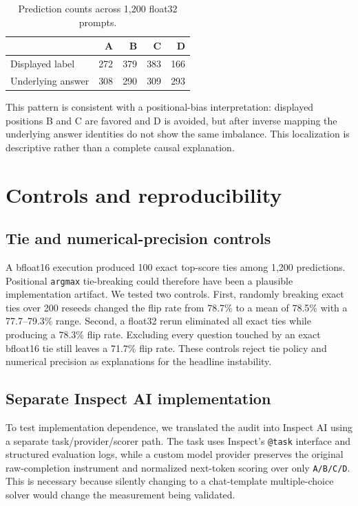 \documentclass[10pt]{article}
\begin{document}
\begin{table}[h]
\centering
\caption{Prediction counts across 1,200 float32 prompts.}
\label{tab:positions}
\begin{tabular}{lrrrr}
\toprule
 & A & B & C & D \\
\midrule
Displayed label & 272 & 379 & 383 & 166 \\
Underlying answer & 308 & 290 & 309 & 293 \\
\bottomrule
\end{tabular}
\end{table}

This pattern is consistent with a positional-bias interpretation: displayed positions B and C are favored and D is avoided, but after inverse mapping the underlying answer identities do not show the same imbalance. This localization is descriptive rather than a complete causal explanation.

\section{Controls and reproducibility}

\subsection{Tie and numerical-precision controls}

A bfloat16 execution produced 100 exact top-score ties among 1,200 predictions. Positional \texttt{argmax} tie-breaking could therefore have been a plausible implementation artifact. We tested two controls. First, randomly breaking exact ties over 200 reseeds changed the flip rate from 78.7\% to a mean of 78.5\% with a 77.7--79.3\% range. Second, a float32 rerun eliminated all exact ties while producing a 78.3\% flip rate. Excluding every question touched by an exact bfloat16 tie still leaves a 71.7\% flip rate. These controls reject tie policy and numerical precision as explanations for the headline instability.

\subsection{Separate Inspect AI implementation}

To test implementation dependence, we translated the audit into Inspect AI using a separate task/provider/scorer path. The task uses Inspect's \texttt{@task} interface and structured evaluation logs, while a custom model provider preserves the original raw-completion instrument and normalized next-token scoring over only \texttt{A/B/C/D}. This is necessary because silently changing to a chat-template multiple-choice solver would change the measurement being validated.
\end{document}
